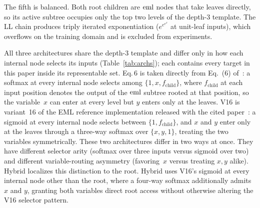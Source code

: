 The fifth is balanced.  Both root children are $\mathrm{eml}$ nodes that
take leaves directly, so its active subtree occupies only the top
two levels of the depth-3 template.  The LL chain produces triply iterated
exponentiation ($e^{e^{e^x}}$ at unit-leaf inputs), which
overflows on the training domain and is excluded from experiments.

All three architectures share the depth-3 template and differ
only in how each internal node selects its inputs
(Table~\ref{tab:archs}); each contains every target in this paper
inside its representable set.  Eq.\,6 is taken directly from
Eq.~(6) of~\citet{Odrzywolek2026eml}: a softmax at every internal
node selects among $\{1, x, f_{\text{child}}\}$, where
$f_{\text{child}}$ at each input position denotes the output of
the $\mathrm{eml}$ subtree rooted at that position, so the variable~$x$
can enter at every level but $y$ enters only at the leaves.  V16
is variant~16 of the EML reference implementation released with
the cited paper~\citep{Odrzywolek2026eml}: a
sigmoid at every internal node selects between
$\{1, f_{\text{child}}\}$, and $x$ and $y$ enter only at the
leaves through a three-way softmax over $\{x, y, 1\}$, treating
the two variables symmetrically.  These two architectures differ
in two ways at once.  They have different selector arity (softmax over three inputs
versus sigmoid over two) and different variable-routing asymmetry
(favoring~$x$ versus treating $x,y$ alike).  Hybrid localizes
this distinction to the root.  Hybrid uses V16's sigmoid at
every internal node other than the root, where a four-way
softmax additionally admits $x$ and $y$, granting both variables
direct root access without otherwise altering the V16 selector
pattern.

